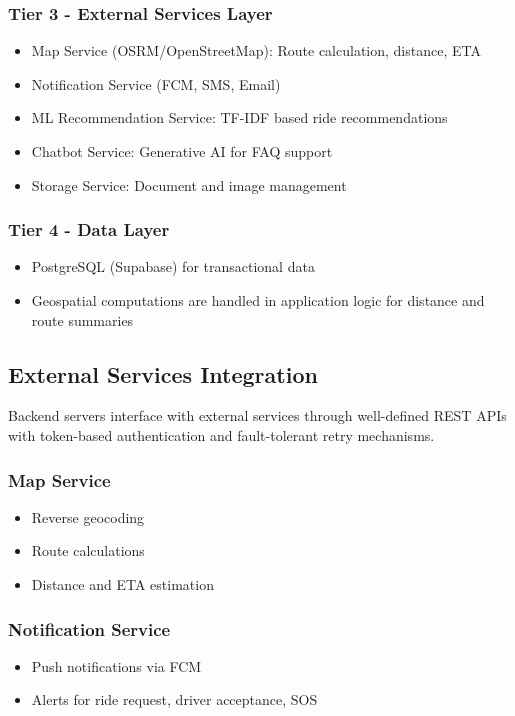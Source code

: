 \subsubsection{Tier 3 - External Services Layer}
\begin{itemize}
    \item Map Service (OSRM/OpenStreetMap): Route calculation, distance, ETA
    \item Notification Service (FCM, SMS, Email)
    \item ML Recommendation Service: TF-IDF based ride recommendations
    \item Chatbot Service: Generative AI for FAQ support
    \item Storage Service: Document and image management
\end{itemize}

\subsubsection{Tier 4 - Data Layer}
\begin{itemize}
    \item PostgreSQL (Supabase) for transactional data
    \item Geospatial computations are handled in application logic for distance and route summaries
\end{itemize}

\subsection{External Services Integration}

Backend servers interface with external services through well-defined REST APIs with token-based authentication and fault-tolerant retry mechanisms.

\subsubsection{Map Service}
\begin{itemize}
    \item Reverse geocoding
    \item Route calculations
    \item Distance and ETA estimation
\end{itemize}

\subsubsection{Notification Service}
\begin{itemize}
    \item Push notifications via FCM
    \item Alerts for ride request, driver acceptance, SOS
\end{itemize}

